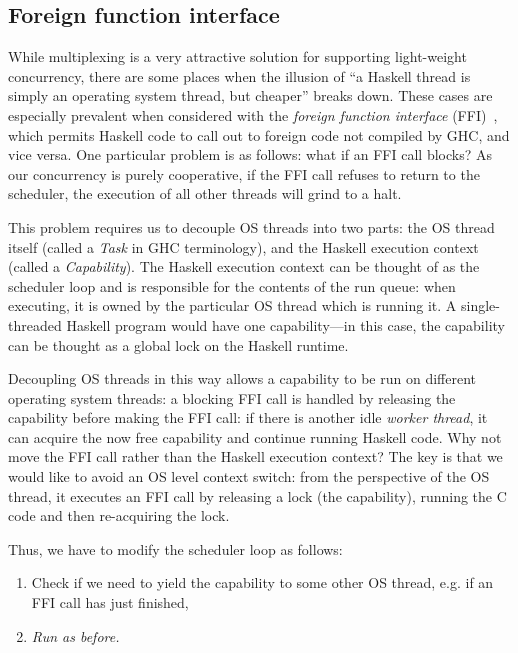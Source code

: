 \subsection{Foreign function interface}

While multiplexing is a very attractive solution for supporting
light-weight concurrency, there are some places when the illusion of ``a
Haskell thread is simply an operating system thread, but cheaper''
breaks down.  These cases are especially prevalent when considered with
the \emph{foreign function interface} (FFI)~\cite{Marlow04extendingthe},
which permits Haskell code to call out to foreign code not compiled by
GHC, and vice versa.  One particular problem is as follows: what if an
FFI call blocks?  As our concurrency is purely cooperative, if the FFI
call refuses to return to the scheduler, the execution of all other
threads will grind to a halt.

This problem requires us to decouple OS threads into two parts: the OS
thread itself (called a \emph{Task} in GHC terminology), and the Haskell
execution context (called a \emph{Capability}).  The Haskell execution
context can be thought of as the scheduler loop and is responsible for
the contents of the run queue: when executing, it is owned by the
particular OS thread which is running it.  A single-threaded Haskell
program would have one capability---in this case, the
capability can be thought as a global lock on the Haskell runtime.

Decoupling OS threads in this way allows a capability to be run on
different operating system threads: a blocking FFI call is handled by
releasing the capability before making the FFI call: if there is another
idle \emph{worker thread}, it can acquire the now free capability and
continue running Haskell code.  Why not move the FFI call rather than
the Haskell execution context?  The key is that we would like to avoid
an OS level context switch: from the perspective of the OS thread, it
executes an FFI call by releasing a lock (the capability), running the C
code and then re-acquiring the lock. 

Thus, we have to modify the scheduler loop as follows:

\begin{enumerate}
    \item Check if we need to yield the capability to some other OS thread, e.g. if an FFI call has just finished,
    \item \emph{Run as before.}
\end{enumerate}

